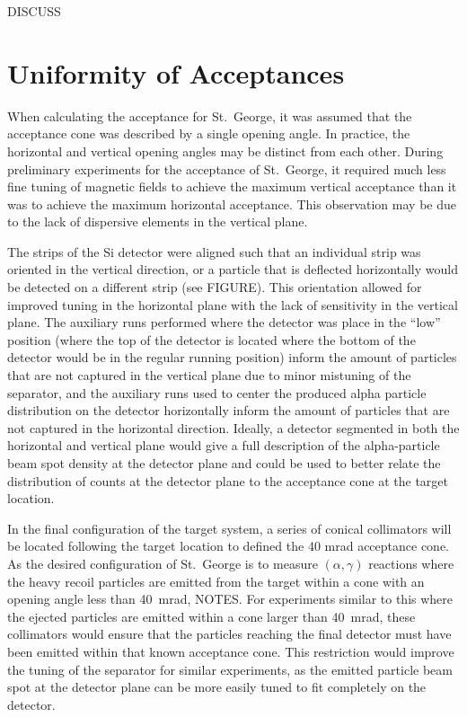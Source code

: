 DISCUSS


\section{Uniformity of Acceptances}
\label{sec:uniformity-of-acceptances}

When calculating the acceptance for St.\ George, it was assumed that the
acceptance cone was described by a single opening angle. In practice,
the horizontal and vertical opening angles may be distinct from each
other. During preliminary experiments for the acceptance of St.\ George,
it required much less fine tuning of magnetic fields to achieve the
maximum vertical acceptance than it was to achieve the maximum
horizontal acceptance. This observation may be due to the lack of
dispersive elements in the vertical plane.

The strips of the Si detector were aligned such that an individual strip
was oriented in the vertical direction, or a particle that is deflected
horizontally would be detected on a different strip (see FIGURE).
This orientation allowed for improved tuning in the horizontal plane
with the lack of sensitivity in the vertical plane. The auxiliary runs
performed where the detector was place in the ``low'' position (where
the top of the detector is located where the bottom of the detector
would be in the regular running position) inform the amount of particles
that are not captured in the vertical plane due to minor mistuning of
the separator, and the auxiliary runs used to center the produced alpha
particle distribution on the detector horizontally inform the amount of
particles that are not captured in the horizontal direction. Ideally, a
detector segmented in both the horizontal and vertical plane would give
a full description of the alpha-particle beam spot density at the
detector plane and could be used to better relate the distribution of
counts at the detector plane to the acceptance cone at the target
location.

In the final configuration of the target system, a series of conical
collimators will be located following the target location to defined the
40 mrad acceptance cone. As the desired configuration of St.\ George is
to measure $(\alpha,\gamma)$ reactions where the heavy recoil particles are
emitted from the target within a cone with an opening angle less than 40~mrad,
NOTES. For experiments similar to this where the ejected
particles are emitted within a cone larger than 40~mrad, these
collimators would ensure that the particles reaching the final detector
must have been emitted within that known acceptance cone. This
restriction would improve the tuning of the separator for similar
experiments, as the emitted particle beam spot at the detector plane can
be more easily tuned to fit completely on the detector.


